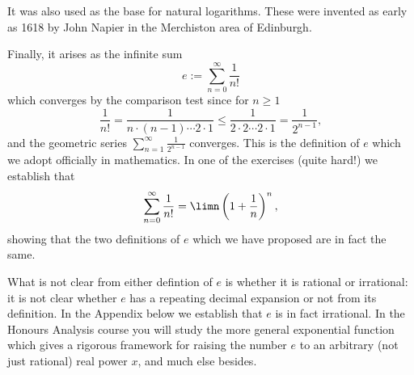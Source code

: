 \documentclass[11pt,dvipsnames]{book}
\numberwithin{figure}{section} %
\numberwithin{table}{section} %
\begin{document}
It was also used as the base for natural logarithms. These were invented as early as 1618 by John Napier in the Merchiston area of Edinburgh.

Finally, it arises as the infinite sum
\[ e := \sum_{n=0}^\infty \frac{1}{n!}\]
which converges by the comparison test since for $n \geq 1$
\[
\frac{1}{n!}=\frac{1}{n\cdot (n-1)\cdots 2\cdot 1}\leq \frac{1}{2\cdot 2\cdots 2\cdot 1 } = \frac{1}{2^{n-1}},
\]
and the geometric series $\sum_{n=1}^{\infty}\frac{1}{2^{n-1}}$ converges. This is the definition of $e$ which we adopt officially in mathematics. In one of the exercises (quite hard!) we establish that
\[
\sum_{n=0}^\infty \frac{1}{n!} = \limn \left(1 + \frac{1}{n}\right)^n,\]
showing that the two definitions of $e$ which we have proposed are in fact the same.

What is not clear from either defintion of $e$ is whether it is rational or irrational: it is not clear whether $e$ has a repeating decimal expansion or not from its definition. In the Appendix below we establish that $e$ is in fact irrational.
In the Honours Analysis course you will study the more general exponential function which gives a rigorous framework for raising the number $e$ to an arbitrary (not just rational) real power $x$, and much else besides.

%
%
%
%
\end{document}
